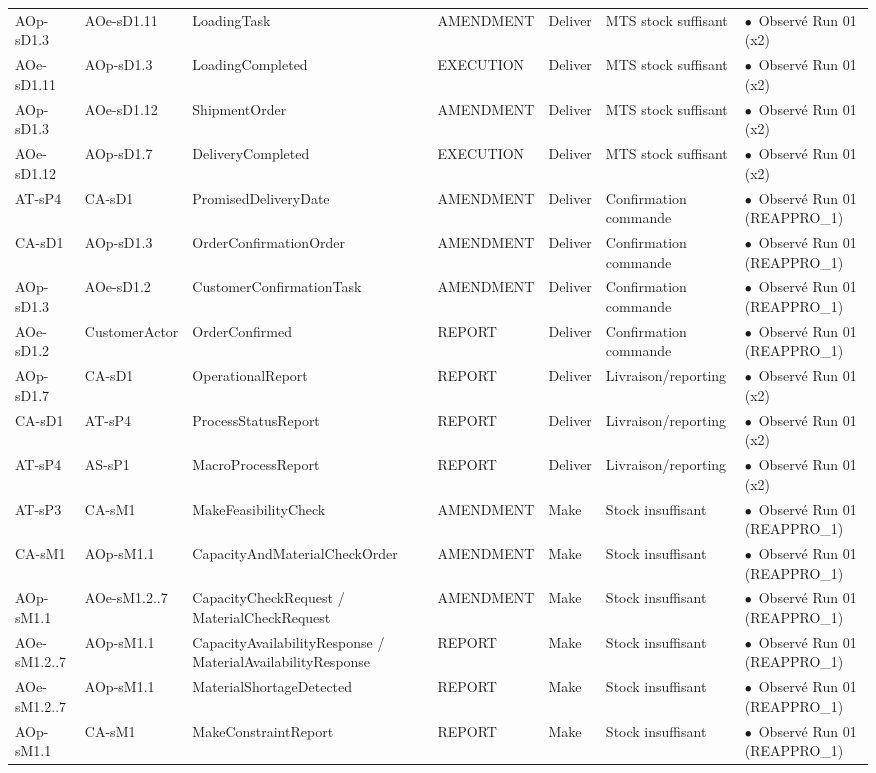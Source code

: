 \documentclass[11pt,a4paper]{article}
\newcommand{\stRUN}{\ensuremath{\bullet}~Observé Run 01}
\begin{document}
\begin{landscape}
{\begin{longtable}{p{2.9cm}p{2.9cm}p{5.6cm}p{2.1cm}p{1.4cm}p{2.6cm}p{2.6cm}}
AOp-sD1.3 & AOe-sD1.11 & \mbox{LoadingTask} & AMENDMENT & Deliver & MTS stock suffisant & \stRUN{} (x2) \\
AOe-sD1.11 & AOp-sD1.3 & \mbox{LoadingCompleted} & EXECUTION & Deliver & MTS stock suffisant & \stRUN{} (x2) \\
AOp-sD1.3 & AOe-sD1.12 & \mbox{ShipmentOrder} & AMENDMENT & Deliver & MTS stock suffisant & \stRUN{} (x2) \\
AOe-sD1.12 & AOp-sD1.7 & \mbox{DeliveryCompleted} & EXECUTION & Deliver & MTS stock suffisant & \stRUN{} (x2) \\
AT-sP4 & CA-sD1 & \mbox{PromisedDeliveryDate} & AMENDMENT & Deliver & Confirmation commande & \stRUN{} (REAPPRO\_1) \\
CA-sD1 & AOp-sD1.3 & \mbox{OrderConfirmationOrder} & AMENDMENT & Deliver & Confirmation commande & \stRUN{} (REAPPRO\_1) \\
AOp-sD1.3 & AOe-sD1.2 & \mbox{CustomerConfirmationTask} & AMENDMENT & Deliver & Confirmation commande & \stRUN{} (REAPPRO\_1) \\
AOe-sD1.2 & CustomerActor & \mbox{OrderConfirmed} & REPORT & Deliver & Confirmation commande & \stRUN{} (REAPPRO\_1) \\
AOp-sD1.7 & CA-sD1 & \mbox{OperationalReport} & REPORT & Deliver & Livraison/reporting & \stRUN{} (x2) \\
CA-sD1 & AT-sP4 & \mbox{ProcessStatusReport} & REPORT & Deliver & Livraison/reporting & \stRUN{} (x2) \\
AT-sP4 & AS-sP1 & \mbox{MacroProcessReport} & REPORT & Deliver & Livraison/reporting & \stRUN{} (x2) \\
AT-sP3 & CA-sM1 & \mbox{MakeFeasibilityCheck} & AMENDMENT & Make & Stock insuffisant & \stRUN{} (REAPPRO\_1) \\
CA-sM1 & AOp-sM1.1 & \mbox{CapacityAndMaterialCheckOrder} & AMENDMENT & Make & Stock insuffisant & \stRUN{} (REAPPRO\_1) \\
AOp-sM1.1 & AOe-sM1.2..7 & \mbox{CapacityCheckRequest} / \mbox{MaterialCheckRequest} & AMENDMENT & Make & Stock insuffisant & \stRUN{} (REAPPRO\_1) \\
AOe-sM1.2..7 & AOp-sM1.1 & \mbox{CapacityAvailabilityResponse} / \mbox{MaterialAvailabilityResponse} & REPORT & Make & Stock insuffisant & \stRUN{} (REAPPRO\_1) \\
AOe-sM1.2..7 & AOp-sM1.1 & \mbox{MaterialShortageDetected} & REPORT & Make & Stock insuffisant & \stRUN{} (REAPPRO\_1) \\
AOp-sM1.1 & CA-sM1 & \mbox{MakeConstraintReport} & REPORT & Make & Stock insuffisant & \stRUN{} (REAPPRO\_1) \\

\end{longtable}}
\end{landscape}
\end{document}
